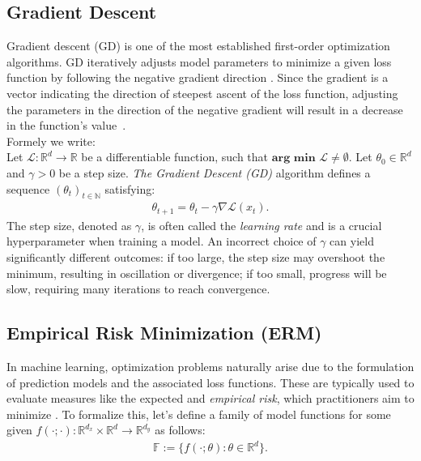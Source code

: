 \subsection{Gradient Descent}
Gradient descent (GD) is one of the most established first-order optimization algorithms. GD iteratively adjusts model
parameters to minimize a given loss function by following the negative gradient direction \cite{toussain2014gradient}.
Since the gradient is a vector indicating the direction of steepest ascent of the loss function, adjusting the parameters in the direction
of the negative gradient will result in a decrease in the function's value~\cite{toussain2014gradient}.\\
Formely we write:\\
\noindent
Let \( \mathcal{L} : \mathbb{R}^d \to \mathbb{R} \) be a differentiable function, such that \(\textbf{arg min } \mathcal{L}  \neq \emptyset \).  
Let \( \theta_0 \in \mathbb{R}^d \) and \( \gamma > 0 \) be a step size.  
\emph{The Gradient Descent (GD)} algorithm defines a sequence \( (\theta_t)_{t \in \mathbb{N}} \) satisfying:
\begin{align}
\theta_{t+1} = \theta_t - \gamma \nabla \mathcal{L}(x_t).
\end{align}
The step size, denoted as $\gamma$, is often called the \emph{learning rate} and is a crucial hyperparameter when training a model.
An incorrect choice of $\gamma$ can yield significantly different outcomes: if too large, the step size may overshoot the minimum, resulting in oscillation or divergence;
if too small, progress will be slow, requiring many iterations to reach convergence. \cite{wu2020wngrad} 


\subsection{Empirical Risk Minimization (ERM)}
\label{sec:erm}

In machine learning, optimization problems naturally arise due to the formulation of prediction models and the associated loss functions.
These are typically used to evaluate measures like the expected and \emph{empirical risk}, which practitioners aim to minimize \cite{bottou2018optimization}.
To formalize this, let's define a family of model functions for some given \( f(\cdot; \cdot) : \mathbb{R}^{d_x} \times \mathbb{R}^d \to \mathbb{R}^{d_y} \) as follows:
\begin{align}
\mathbb{F} := \{ f(\cdot; \theta) : \theta \in \mathbb{R}^d \}.
\end{align}

